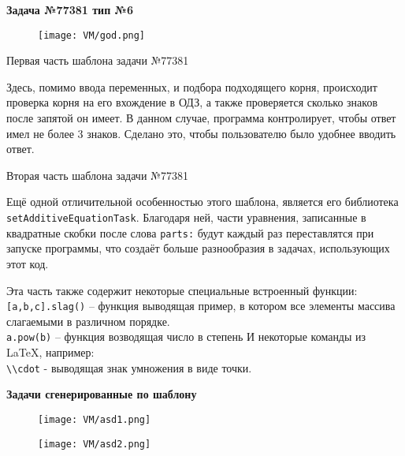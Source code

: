 \textbf{Задача №77381 тип №6}

\begin{figure}[h]
	\centering
	\texttt{[image: VM/god.png]}
\end{figure}

Первая часть шаблона задачи №77381
 
Здесь, помимо ввода переменных, и подбора подходящего корня, происходит проверка корня на его вхождение в ОДЗ, а также проверяется сколько знаков после запятой он имеет. В данном случае, программа контролирует, чтобы ответ имел не более 3 знаков. Сделано это, чтобы пользователю было удобнее вводить ответ.



Вторая часть шаблона задачи №77381

Ещё одной отличительной особенностью этого шаблона, является его библиотека \texttt{setAdditiveEquationTask}. Благодаря ней, части уравнения, записанные в квадратные скобки после слова \texttt{parts:} будут каждый раз переставлятся при запуске программы, что создаёт больше разнообразия в задачах, использующих этот код.

Эта часть также содержит некоторые специальные встроенный функции:
\\ \texttt{[a,b,c].slag()} – функция выводящая пример, в котором все элементы массива слагаемыми в различном порядке.
\\ \texttt{a.pow(b)} – функция возводящая число в степень
И некоторые команды из \LaTeX, например: 
\\  \texttt{\textbackslash \textbackslash cdot} - выводящая знак умножения в виде точки.



\newpage

\textbf{Задачи сгенерированные по шаблону}

\begin{figure}[h]
	\centering
	\texttt{[image: VM/asd1.png]}
	\end{figure}
	\begin{figure}[h]
	\centering
	\texttt{[image: VM/asd2.png]}
\end{figure}
